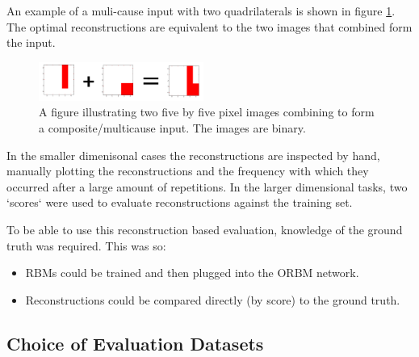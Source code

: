  An example of a muli-cause input with two quadrilaterals is shown in figure \ref{F:Composite-Example}. The optimal reconstructions are equivalent to the two images that combined form the input.

\begin{figure}
  \begin{center}
    \includegraphics[width=0.48\textwidth]{Assets/Composite-Example.png}
  \end{center}
  \caption{A figure illustrating two five by five pixel images combining to form a composite/multicause input. The images are binary.}
  \label{F:Composite-Example}
\end{figure}

In the smaller dimenisonal cases the reconstructions are inspected by hand, manually plotting the reconstructions and the frequency with which they occurred after a large amount of repetitions. In the larger dimensional tasks, two `scores` were used to evaluate reconstructions against the training set.

To be able to use this reconstruction based evaluation, knowledge of the ground truth was required. This was so:
\begin{itemize}
  \item RBMs could be trained and then plugged into the ORBM network.
  \item Reconstructions could be compared directly (by score) to the ground truth.
\end{itemize}


\subsection{Choice of Evaluation Datasets}

